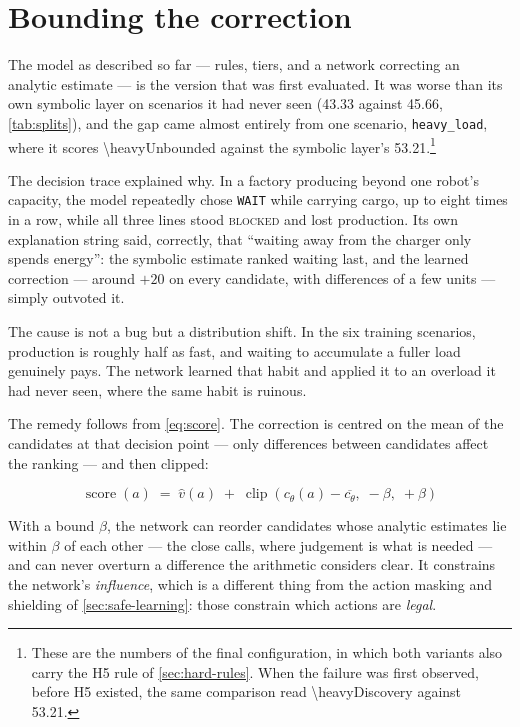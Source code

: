 \section{Bounding the correction}
\label{sec:bounded-correction}

The model as described so far --- rules, tiers, and a network correcting an analytic estimate ---
is the version that was first evaluated. It was worse than its own symbolic layer on scenarios it
had never seen (\num{43.33} against \num{45.66}, \cref{tab:splits}), and the gap came almost
entirely from one scenario, \texttt{heavy\_load}, where it scores \num{\heavyUnbounded} against
the symbolic layer's \num{53.21}.\footnote{These are the numbers of the final configuration, in
which both variants also carry the H5 rule of \cref{sec:hard-rules}. When the failure was first
observed, before H5 existed, the same comparison read \num{\heavyDiscovery} against
\num{53.21}.}

The decision trace explained why. In a factory producing beyond one robot's capacity, the model
repeatedly chose \texttt{WAIT} while carrying cargo, up to eight times in a row, while all three
lines stood \textsc{blocked} and lost production. Its own explanation string said, correctly,
that ``waiting away from the charger only spends energy'': the symbolic estimate ranked waiting
last, and the learned correction --- around $+20$ on every candidate, with differences of a few
units --- simply outvoted it.

The cause is not a bug but a distribution shift. In the six training scenarios, production is
roughly half as fast, and waiting to accumulate a fuller load genuinely pays. The network learned
that habit and applied it to an overload it had never seen, where the same habit is ruinous.

The remedy follows from \cref{eq:score}. The correction is centred on the mean of the candidates
at that decision point --- only differences between candidates affect the ranking --- and then
clipped:

\begin{equation}
    \label{eq:bounded}
    \operatorname{score}(a) \;=\; \hat{v}(a)
        \;+\; \operatorname{clip}\!\left(c_\theta(a) - \overline{c_\theta},\; -\beta,\; +\beta\right)
\end{equation}

With a bound $\beta$, the network can reorder candidates whose analytic estimates lie within
$\beta$ of each other --- the close calls, where judgement is what is needed --- and can never
overturn a difference the arithmetic considers clear. It constrains the network's
\emph{influence}, which is a different thing from the action masking and shielding of
\cref{sec:safe-learning}: those constrain which actions are \emph{legal}.


